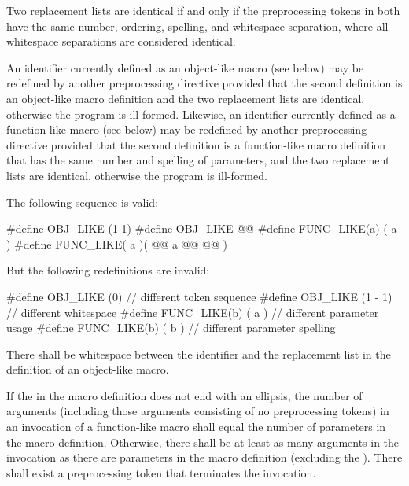 \pnum
{}%
Two replacement lists are identical if and only if
the preprocessing tokens in both have
the same number, ordering, spelling, and whitespace separation,
where all whitespace separations are considered identical.

\pnum
An identifier currently defined as an
%
object-like macro (see below) may be redefined by another
preprocessing directive provided that the second definition is an
object-like macro definition and the two replacement lists
are identical, otherwise the program is ill-formed.
Likewise, an identifier currently defined as a
%
function-like macro (see below) may be redefined by another
preprocessing directive provided that the second definition is a
function-like macro definition that has the same number and spelling
of parameters,
and the two replacement lists are identical,
otherwise the program is ill-formed.

\pnum
\begin{example}
The following sequence is valid:
\begin{codeblock}
#define OBJ_LIKE      (1-1)
#define OBJ_LIKE      @@
#define FUNC_LIKE(a)   ( a )
#define FUNC_LIKE( a )(     @@
                a @@
                  @\tcode{*/}@ )
\end{codeblock}
But the following redefinitions are invalid:
\begin{codeblock}
#define OBJ_LIKE    (0)         // different token sequence
#define OBJ_LIKE    (1 - 1)     // different whitespace
#define FUNC_LIKE(b) ( a )      // different parameter usage
#define FUNC_LIKE(b) ( b )      // different parameter spelling
\end{codeblock}
\end{example}

\pnum
{}%
There shall be whitespace between the identifier and the replacement list
in the definition of an object-like macro.

\pnum
If the  in the macro definition does not end with
an ellipsis, the number of arguments (including those arguments consisting
of no preprocessing tokens)
in an invocation of a function-like macro shall
equal the number of parameters in the macro definition.
Otherwise, there shall be at least as many arguments in the invocation as there are
parameters in the macro definition (excluding the ). There
shall exist a
\tcode{)}
preprocessing token that terminates the invocation.

